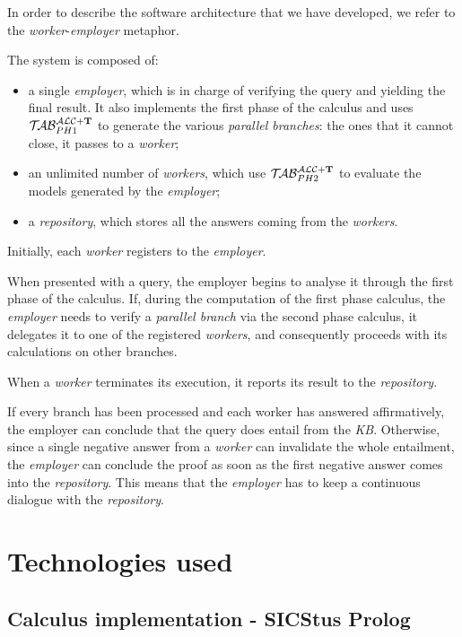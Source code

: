\documentclass[a4paper, 11pt, oneside]{duthesis}
\newcommand{\tip}{{\bf T}}
\newcommand{\primo}{\mathrel{{\mathcal{T}\!\mathcal{AB}}}_{PH 1}^{\mathcal{ALC}+\mbox{\scriptsize $\tip$}}}
\newcommand{\secondo}{\mathrel{{\mathcal{T}\!\mathcal{AB}}}_{PH 2}^{\mathcal{ALC}+\mbox{\scriptsize $\tip$}}}
\begin{document}
In order to describe the software architecture that we have developed, we refer to the \emph{worker}-\emph{employer} metaphor.

The system is composed of:
\begin{itemize}
\item a single \emph{employer}, which is in charge of verifying the query and yielding the final result. It also implements the first phase of the calculus and uses $\primo$ to generate the various \emph{parallel branches}: the ones that it cannot close, it passes to a \emph{worker};
\item an unlimited number of \emph{workers}, which use $\secondo$ to evaluate the models generated by the \emph{employer};
\item a \emph{repository}, which stores all the answers coming from the \emph{workers}.
\end{itemize}
Initially, each \emph{worker} registers to the \emph{employer}.

When presented with a query, the employer begins to analyse it through the first phase of the calculus.
If, during the computation of the first phase calculus, the \emph{employer} needs to verify a \emph{parallel branch} via the second phase calculus, it delegates it to one of the registered \emph{workers}, and consequently proceeds with its calculations on other branches.

When a \emph{worker} terminates its execution, it reports its result to the \emph{repository}.

If every branch has been processed and each worker has answered affirmatively, the employer can conclude that the query does entail from the \emph{KB}.
Otherwise, since a single negative answer from a \emph{worker} can invalidate the whole entailment, the \emph{employer} can conclude the proof as soon as the first negative answer comes into the \emph{repository}.
This means that the \emph{employer} has to keep a continuous dialogue with the \emph{repository}.

\newpage

\section{Technologies used}\label{tech}


\subsection{Calculus implementation - SICStus Prolog}
\end{document}

